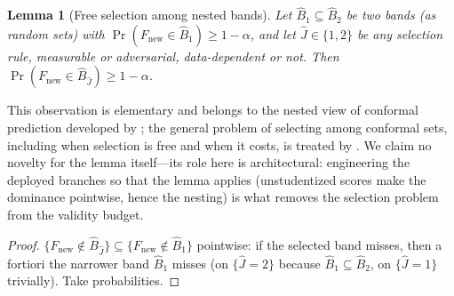 \documentclass[12pt]{article}
\newtheorem{lemma}{Lemma}
\theoremstyle{definition}
\theoremstyle{remark}
\begin{document}
\begin{lemma}[Free selection among nested bands]\label{lem:nested}
Let $\widehat B_1\subseteq\widehat B_2$ be two bands (as random sets) with
$\Pr(F_{\text{new}}\in\widehat B_1)\ge1-\alpha$, and let
$\widehat J\in\{1,2\}$ be \emph{any} selection rule, measurable or adversarial,
data-dependent or not. Then $\Pr(F_{\text{new}}\in\widehat B_{\widehat J})\ge1-\alpha$.
\end{lemma}

This observation is elementary and belongs to the nested view of conformal
prediction developed by \citet{gupta2022nested}; the general problem of selecting
among conformal sets, including when selection is free and when it costs, is treated
by \citet{yang2024selection}. We claim no novelty for the lemma itself---its role
here is architectural: engineering the deployed branches so that the lemma applies
(unstudentized scores make the dominance pointwise, hence the nesting) is what
removes the selection problem from the validity budget.

\begin{proof}
$\{F_{\text{new}}\notin\widehat B_{\widehat J}\}\subseteq
\{F_{\text{new}}\notin\widehat B_1\}$ pointwise: if the selected band misses, then a
fortiori the narrower band $\widehat B_1$ misses (on $\{\widehat J=2\}$ because
$\widehat B_1\subseteq\widehat B_2$, on $\{\widehat J=1\}$ trivially). Take
probabilities.
\end{proof}
\end{document}
